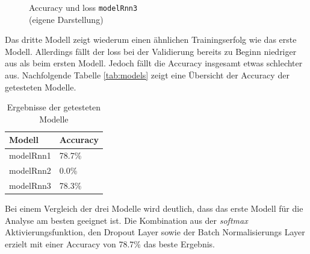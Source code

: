 \documentclass[
    12pt, %
    DIV10,
    ngerman, %
    a4paper, %
    oneside, %
    titlepage, %
    parskip=half, %
    headings=normal, %
    listof=totoc, %
    bibliography=totoc, %
    index=totoc, %
    captions=tableheading, %
    final %
]{scrreprt}
\begin{document}
\begin{figure}[H]
\caption{Accuracy und loss \texttt{modelRnn3}\\(eigene Darstellung)}\label{fig:rnn3}
\end{figure}
Das dritte Modell zeigt wiederum einen ähnlichen Trainingserfolg wie das erste Modell. Allerdings fällt der loss bei der Validierung bereits zu Beginn niedriger aus als beim ersten Modell. Jedoch fällt die Accuracy insgesamt etwas schlechter aus. Nachfolgende Tabelle \ref{tab:models} zeigt eine Übersicht der  Accuracy der getesteten Modelle.

\begin{table}[H]
\begin{center}
\begin{tabular}{ll}
\hline
\textbf{Modell}     & \textbf{Accuracy} \\ \hline
modelRnn1 & 78.7\%        \\ \hline
modelRnn2 & 0.0\%         \\ \hline
modelRnn3 & 78.3\%        \\ \hline
\end{tabular}
\caption{Ergebnisse der getesteten Modelle}\label{tab:models}
\label{tab:acc}
\end{center}
\end{table}
Bei einem Vergleich der drei Modelle wird deutlich, dass das erste Modell für die Analyse am besten geeignet ist. Die Kombination aus der \emph{softmax} Aktivierungsfunktion, den Dropout Layer sowie der Batch Normalisierungs Layer erzielt mit einer Accuracy von 78.7\% das beste Ergebnis. 
\end{document}
